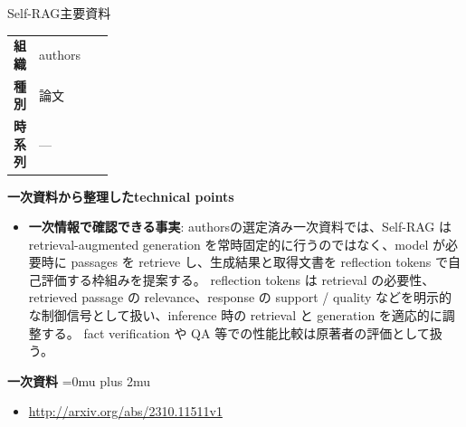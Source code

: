 \begin{technicalnote}{Self-RAG}{主要資料}
\begingroup
\begin{tabularx}{\linewidth}{@{}>{\bfseries}p{0.22\linewidth}X@{}}
組織 & authors \\
種別 & 論文 \\
時系列 & — \\
\end{tabularx}
\smallskip
{\bfseries 一次資料から整理したtechnical points}
\begin{itemize}[leftmargin=1.5em,itemsep=0.35em]
\item \textbf{一次情報で確認できる事実}: authorsの選定済み一次資料では、Self-RAG は retrieval-augmented generation を常時固定的に行うのではなく、model が必要時に passages を retrieve し、生成結果と取得文書を reflection tokens で自己評価する枠組みを提案する。 reflection tokens は retrieval の必要性、retrieved passage の relevance、response の support / quality などを明示的な制御信号として扱い、inference 時の retrieval と generation を適応的に調整する。 fact verification や QA 等での性能比較は原著者の評価として扱う。
\end{itemize}
\begin{minipage}{\linewidth}
\begin{samepage}
{\bfseries 一次資料}
\begingroup\sloppy
\Urlmuskip=0mu plus 2mu\relax
\begin{itemize}[leftmargin=1.5em,itemsep=0.25em]
\item {\scriptsize\url{http://arxiv.org/abs/2310.11511v1}}
\end{itemize}
\endgroup
\end{samepage}
\end{minipage}
\endgroup
\end{technicalnote}
\medskip

